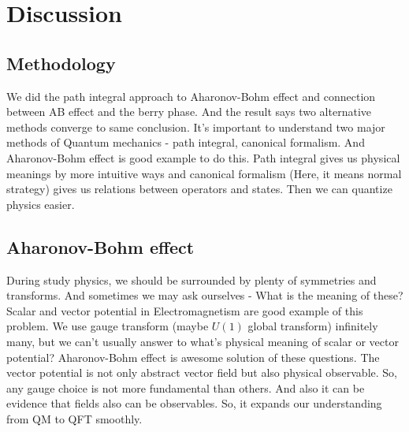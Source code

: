 \documentclass[%
 reprint,
 amsmath,amssymb,
 aps,
]{revtex4-1}
\begin{document}
\section{\label{sec:level4}Discussion}

\subsection{\label{sec:level4.1}Methodology}

We did the path integral approach to Aharonov-Bohm effect and connection between AB effect and the berry phase. And the result says two alternative methods converge to same conclusion. It's important to understand two major methods of Quantum mechanics - path integral, canonical formalism. And Aharonov-Bohm effect is good example to do this. Path integral gives us physical meanings by more intuitive ways and canonical formalism (Here, it means normal strategy) gives us relations between operators and states. Then we can quantize physics easier.

\subsection{\label{sec:level4.2}Aharonov-Bohm effect}

During study physics, we should be surrounded by plenty of symmetries and transforms. And sometimes we may ask ourselves - What is the meaning of these?
Scalar and vector potential in Electromagnetism are good example of this problem. We use gauge transform (maybe $U(1)$ global transform) infinitely many, but we can't usually answer to what's physical meaning of scalar or vector potential? 
Aharonov-Bohm effect is awesome solution of these questions. The vector potential is not only abstract vector field but also physical observable. So, any gauge choice is not more fundamental than others. And also it can be evidence that fields also can be observables. So, it expands our understanding from QM to QFT smoothly.
\end{document}
